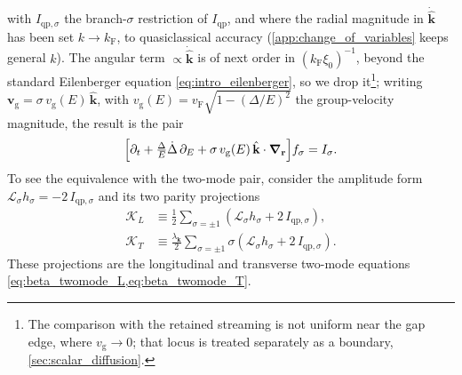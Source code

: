 \documentclass[
  aps,
  prb,
  preprint,
  superscriptaddress,
  longbibliography,
  nofootinbib
]{revtex4-2}
\newcommand{\br}{\mathbf{r}}
\newcommand{\bk}{\mathbf{k}}
\newcommand{\bv}{\mathbf{v}}
\newcommand{\bnabla}{\boldsymbol{\nabla}}
\newcommand{\vF}{v_{\mathrm{F}}}
\newcommand{\vg}{v_{\mathrm{g}}}
\newcommand{\Iqp}{I_{\mathrm{qp}}}
\begin{document}
with \(I_{\mathrm{qp},\sigma}\) the branch-\(\sigma\) restriction of
\(\Iqp\), and where the radial magnitude in \(\dot{\hat{\bk}}\) has
been set \(k\to k_{\mathrm F}\), to quasiclassical accuracy
(\cref{app:change_of_variables} keeps general \(k\)).
The angular term \(\propto\dot{\hat{\bk}}\) is of next order in
\((k_{\mathrm F}\xi_0)^{-1}\), beyond the standard Eilenberger equation
\cref{eq:intro_eilenberger}, so we drop it\footnote{The comparison with the retained
streaming is not uniform near the gap edge, where \(\vg\to0\); that
locus is treated separately as a boundary,
\cref{sec:scalar_diffusion}.}; writing \(\bv_{\mathrm{g}}=\sigma\,\vg(E)\,\hat{\bk}\), with \(\vg(E)=\vF\sqrt{1-(\Delta/E)^{2}}\) the group-velocity magnitude, the result is the pair
\begin{equation}
  \Bigl[\partial_t+\tfrac{\Delta}{E}\dot{\Delta}\,\partial_E
  +\sigma\,\vg(E)\,\hat{\bk}\cdot\bnabla_{\br}\Bigr]f_\sigma
  = I_\sigma .
  \label{eq:intro_branch}
\end{equation}
To see the equivalence with the two-mode pair, consider the amplitude form \(\mathcal L_\sigma h_{\sigma} = -2\,I_{\mathrm{qp},\sigma}\) and its two parity projections
\begin{align}
  \mathcal K_L
  &\equiv \tfrac12\textstyle\sum_{\sigma=\pm1}
    \left(\mathcal L_\sigma h_{\sigma} + 2\,I_{\mathrm{qp},\sigma}\right),
  \label{eq:beta_KL_projection}\\
  \mathcal K_T
  &\equiv \tfrac{\lambda_{\bk}}{2}\textstyle\sum_{\sigma=\pm1}\sigma
    \left(\mathcal L_\sigma h_{\sigma} + 2\,I_{\mathrm{qp},\sigma}\right).
  \label{eq:beta_KT_projection}
\end{align}
These projections are the
longitudinal and transverse two-mode equations
\cref{eq:beta_twomode_L,eq:beta_twomode_T}.
\end{document}
